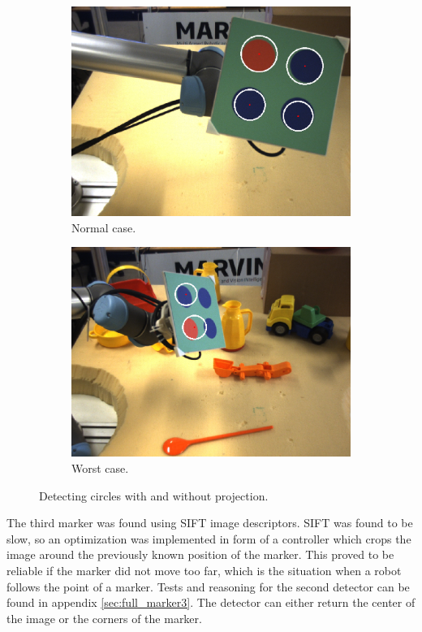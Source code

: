 \begin{figure}[h]
 \centering
 \begin{subfigure}{0.49\linewidth}
 \includegraphics[width=\linewidth]{graphics/best_case_hough_circle}
 \caption{Normal case.}
 \end{subfigure}
 \begin{subfigure}{0.49\linewidth}
 \includegraphics[width=\linewidth]{graphics/worst_case_hough_circle}
 \caption{Worst case.}
 \end{subfigure}
 \caption{Detecting circles with and without projection.}
 \label{fig:circle_detection}
\end{figure}


The third marker was found using SIFT image descriptors.
SIFT was found to be slow, so an optimization was implemented in form of a controller which crops the image around the previously known position of the marker.
This proved to be reliable if the marker did not move too far, which is the situation when a robot follows the point of a marker.
Tests and reasoning for the second detector can be found in appendix \ref{sec:full_marker3}.
The detector can either return the center of the image or the corners of the marker.